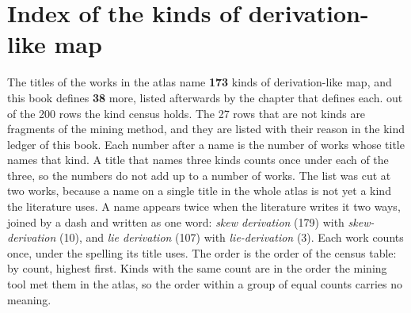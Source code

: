 \chapter*{Index of the kinds of derivation-like map}\label{page:index-of-kinds}
The titles of the works in the atlas name \textbf{173} kinds of derivation-like map, %
and this book defines \textbf{38} more, listed afterwards by the chapter that %
defines each. %
out of the 200 rows the kind census holds. The 27 rows that are not kinds are %
fragments of the mining method, and they are listed with their reason in the
kind ledger of this book.
Each number after a name is the number of works whose title names that kind. A %
title that names three kinds counts once under each of the three, so the numbers
do not add up to a number of works.
The list was cut at two works, because a name on a single title in the whole %
atlas is not yet a kind the literature uses.
A name appears twice when the literature writes it two ways, joined by a dash and %
written as one word: \emph{skew derivation} (179) with \emph{skew-derivation} (10), and
\emph{lie derivation} (107) with \emph{lie-derivation} (3). Each work counts once, %
under the spelling its title uses.
The order is the order of the census table: by count, highest first. Kinds with %
the same count are in the order the mining tool met them in the atlas, so the %
order within a group of equal counts carries no meaning.

